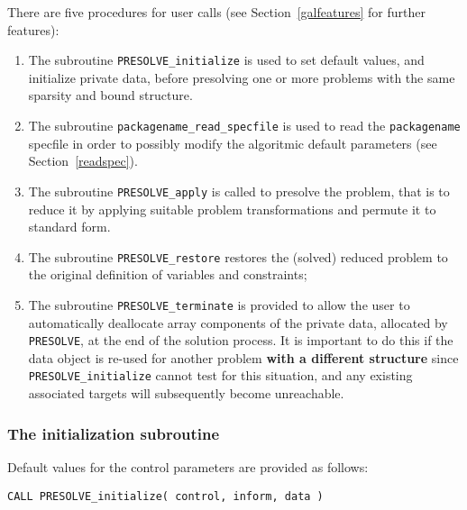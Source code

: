 \documentclass{galahad}
\newcommand{\packagename}{PRESOLVE}
\begin{document}

\galarguments
There are five procedures for user calls
(see Section~\ref{galfeatures} for further features): 

\begin{enumerate}
\item The subroutine {\tt \packagename\_initialize} 
      is used to set default values, and initialize private data, 
      before presolving one or more problems with the
      same sparsity and bound structure.
\item The subroutine {\tt packagename\_read\_specfile}
      is used to read the {\tt packagename} specfile in order to
      possibly modify the algoritmic default parameters (see
      Section~\ref{readspec}). 
\item The subroutine {\tt \packagename\_apply} 
      is called to presolve the problem, that is to reduce it by applying
      suitable problem transformations and permute it to standard form.
\item The subroutine {\tt \packagename\_restore} 
      restores the (solved) reduced problem to the original definition
      of variables and constraints;
\item The subroutine {\tt \packagename\_terminate} 
      is provided to allow the user to automatically deallocate array 
      components of the private data, allocated by 
      {\tt \packagename}, at the end of the solution process. 
      It is important to do this if the data object is re-used for another 
      problem {\bf with a different structure}
      since {\tt \packagename\_initialize} cannot test for this situation, 
      and any existing associated targets will subsequently become unreachable.
\end{enumerate}


\subsubsection{The initialization subroutine}\label{subinit}


Default values for the control parameters are provided as follows:
\vspace*{1mm}

\hspace{8mm}
{\tt CALL \packagename\_initialize( control, inform, data )}
\end{document}
